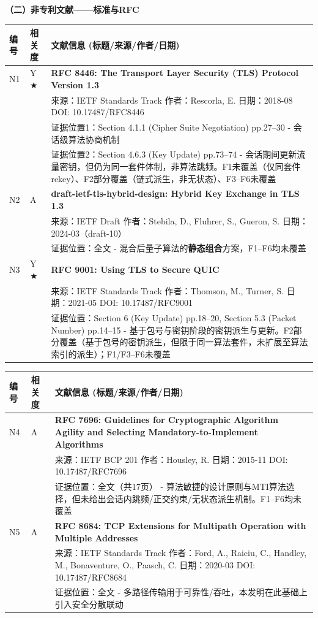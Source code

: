﻿\documentclass[12pt,a4paper]{article}
\begin{document}
\clearpage
\textbf{（二）非专利文献——标准与RFC}

\begingroup
{}
\small
\renewcommand{\arraystretch}{1.2}
\begin{tabular}{|p{1.2cm}|p{1.8cm}|p{11.0cm}|}
\hline
\textbf{编号} & \textbf{相关度} & \textbf{文献信息 (标题/来源/作者/日期)} \\
\hline

N1 & Y $\bigstar$ & \textbf{RFC 8446: The Transport Layer Security (TLS) Protocol Version 1.3} \\
& & 来源：IETF Standards Track \quad 作者：Rescorla, E. \quad 日期：2018-08 \quad DOI: 10.17487/RFC8446 \\
& & 证据位置1：Section 4.1.1 (Cipher Suite Negotiation) pp.27--30 - 会话级算法协商机制 \\
& & 证据位置2：Section 4.6.3 (Key Update) pp.73--74 - 会话期间更新流量密钥，但仍为同一套件体制，非算法跳频。F1未覆盖（仅同套件rekey）、F2部分覆盖（链式派生，非无状态）、F3--F6未覆盖 \\
\hline
N2 & A & \textbf{draft-ietf-tls-hybrid-design: Hybrid Key Exchange in TLS 1.3} \\
& & 来源：IETF Draft \quad 作者：Stebila, D., Fluhrer, S., Gueron, S. \quad 日期：2024-03（draft-10） \\
& & 证据位置：全文 - 混合后量子算法的\textbf{静态组合}方案，F1--F6均未覆盖 \\
\hline
N3 & Y $\bigstar$ & \textbf{RFC 9001: Using TLS to Secure QUIC} \\
& & 来源：IETF Standards Track \quad 作者：Thomson, M., Turner, S. \quad 日期：2021-05 \quad DOI: 10.17487/RFC9001 \\
& & 证据位置：Section 6 (Key Update) pp.18--20, Section 5.3 (Packet Number) pp.14--15 - 基于包号与密钥阶段的密钥派生与更新。F2部分覆盖（基于包号的密钥派生，但限于同一算法套件，未扩展至算法索引的派生）；F1/F3--F6未覆盖 \\
\hline
\end{tabular}

\clearpage
\begin{tabular}{|p{1.2cm}|p{1.8cm}|p{11.0cm}|}
\hline
\textbf{编号} & \textbf{相关度} & \textbf{文献信息 (标题/来源/作者/日期)} \\
\hline
N4 & A & \textbf{RFC 7696: Guidelines for Cryptographic Algorithm Agility and Selecting Mandatory-to-Implement Algorithms} \\
& & 来源：IETF BCP 201 \quad 作者：Housley, R. \quad 日期：2015-11 \quad DOI: 10.17487/RFC7696 \\
& & 证据位置：全文（共17页） - 算法敏捷的设计原则与MTI算法选择，但未给出会话内跳频/正交约束/无状态派生机制。F1--F6均未覆盖 \\
\hline
N5 & A & \textbf{RFC 8684: TCP Extensions for Multipath Operation with Multiple Addresses} \\
& & 来源：IETF Standards Track \quad 作者：Ford, A., Raiciu, C., Handley, M., Bonaventure, O., Paasch, C. \quad 日期：2020-03 \quad DOI: 10.17487/RFC8684 \\
& & 证据位置：全文 - 多路径传输用于可靠性/吞吐，本发明在此基础上引入安全分散联动 \\
\hline

\end{tabular}
\endgroup
\end{document}
